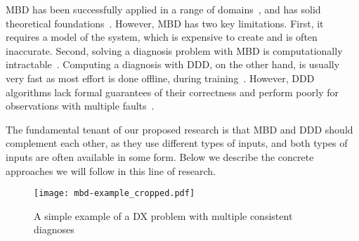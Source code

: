 \documentclass[12pt]{article}
\begin{document}
MBD has been successfully applied in a range of domains~\cite{williams96,struss2003model,wotawa2002model}, and has solid theoretical foundations~\cite{deKleer1987diagnosing,reiter1987theory}. However, MBD has two key limitations. First, it requires a model of the system, which is expensive to create and is often inaccurate. Second, solving a diagnosis problem with MBD is computationally intractable~\cite{bylander1991computational}. Computing a diagnosis with DDD, on the other hand, is usually very fast as most effort is done offline, during training~\cite{muralidharan2014fault}. However, DDD algorithms lack formal guarantees of their correctness and perform poorly for observations with multiple faults~\cite{keren2011model}. 


The fundamental tenant of our proposed research is that MBD and DDD should complement each other, as they use different types of inputs, and both types of inputs are often available in some form. 
Below we describe the concrete approaches we will follow in this line of research.



\begin{figure}
    \centering
	\texttt{[image: mbd-example\_cropped.pdf]}
    \caption{A simple example of a DX problem with multiple consistent diagnoses}
    \label{fig:mbd-example}
\end{figure}

\end{document}
